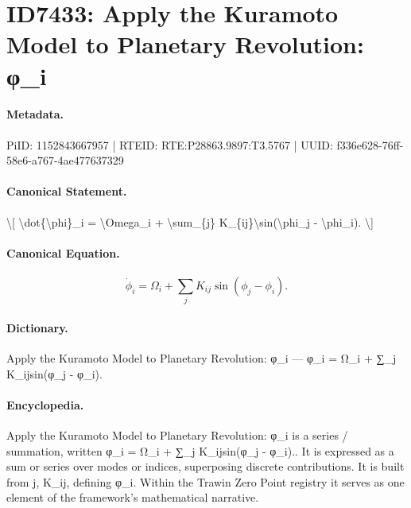 \section*{ID7433: Apply the Kuramoto Model to Planetary Revolution: φ\_i}
\paragraph{Metadata.}
PiID: 1152843667957 | RTEID: RTE:P28863.9897:T3.5767 | UUID: f336e628-76ff-58e6-a767-4ae477637329

\paragraph{Canonical Statement.}
\textbackslash{}[ \textbackslash{}dot\{\textbackslash{}phi\}\_i = \textbackslash{}Omega\_i + \textbackslash{}sum\_\{j\} K\_\{ij\}\textbackslash{}sin(\textbackslash{}phi\_j - \textbackslash{}phi\_i). \textbackslash{}]

\paragraph{Canonical Equation.}
\[
\dot{\phi}_i = \Omega_i + \sum_{j} K_{ij}\sin(\phi_j - \phi_i).
\]

\paragraph{Dictionary.}
Apply the Kuramoto Model to Planetary Revolution: φ\_i — φ\_i = Ω\_i + ∑\_j K\_ijsin(φ\_j - φ\_i).

\paragraph{Encyclopedia.}
Apply the Kuramoto Model to Planetary Revolution: φ\_i is a series / summation, written φ\_i = Ω\_i + ∑\_j K\_ijsin(φ\_j - φ\_i).. It is expressed as a sum or series over modes or indices, superposing discrete contributions. It is built from j, K\_ij, defining φ\_i. Within the Trawin Zero Point registry it serves as one element of the framework's mathematical narrative.
